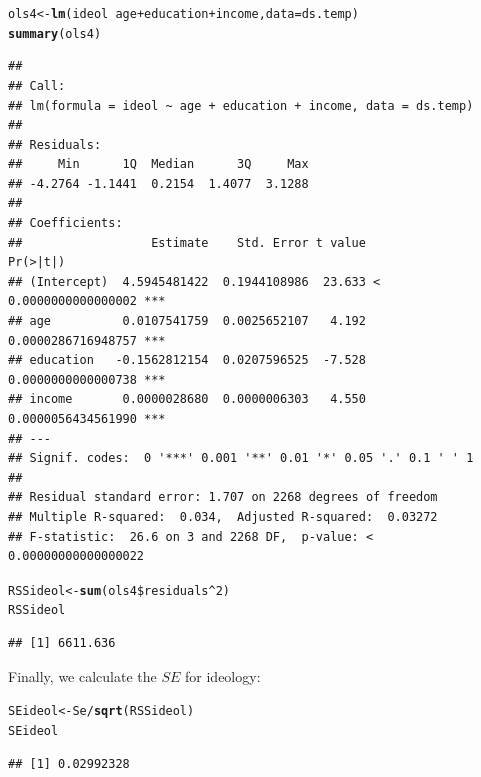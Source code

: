 \documentclass[11pt,openany]{book}\usepackage[]{graphicx}\usepackage[]{color}
\makeatletter
\newcommand{\hlnum}[1]{\textcolor[rgb]{0.686,0.059,0.569}{#1}}%
\newcommand{\hlopt}[1]{\textcolor[rgb]{0,0,0}{#1}}%
\newcommand{\hlstd}[1]{\textcolor[rgb]{0.345,0.345,0.345}{#1}}%
\newcommand{\hlkwb}[1]{\textcolor[rgb]{0.69,0.353,0.396}{#1}}%
\newcommand{\hlkwc}[1]{\textcolor[rgb]{0.333,0.667,0.333}{#1}}%
\newcommand{\hlkwd}[1]{\textcolor[rgb]{0.737,0.353,0.396}{\textbf{#1}}}%
\newenvironment{kframe}{%
 \def\at@end@of@kframe{}%
 \ifinner\ifhmode%
  \def\at@end@of@kframe{\end{minipage}}%
  \begin{minipage}{\columnwidth}%
 \fi\fi%
 \def\FrameCommand##1{\hskip\@totalleftmargin \hskip-\fboxsep
 \colorbox{shadecolor}{##1}\hskip-\fboxsep
     \hskip-\linewidth \hskip-\@totalleftmargin \hskip\columnwidth}%
 \MakeFramed {\advance\hsize-\width
   \@totalleftmargin\z@ \linewidth\hsize
   \@setminipage}}%
 {\par\unskip\endMakeFramed%
 \at@end@of@kframe}
\newenvironment{knitrout}{}{} %
\renewenvironment{knitrout}{\begin{singlespace}}{\end{singlespace}}
\makeatother
\begin{document}
\begin{knitrout}
\color{fgcolor}\begin{kframe}
\begin{alltt}
\hlstd{ols4} \hlkwb{<-} \hlkwd{lm}\hlstd{(ideol} \hlopt{~} \hlstd{age} \hlopt{+} \hlstd{education} \hlopt{+} \hlstd{income,} \hlkwc{data} \hlstd{= ds.temp)}
\hlkwd{summary}\hlstd{(ols4)}
\end{alltt}
\begin{verbatim}
## 
## Call:
## lm(formula = ideol ~ age + education + income, data = ds.temp)
## 
## Residuals:
##     Min      1Q  Median      3Q     Max 
## -4.2764 -1.1441  0.2154  1.4077  3.1288 
## 
## Coefficients:
##                  Estimate    Std. Error t value             Pr(>|t|)    
## (Intercept)  4.5945481422  0.1944108986  23.633 < 0.0000000000000002 ***
## age          0.0107541759  0.0025652107   4.192   0.0000286716948757 ***
## education   -0.1562812154  0.0207596525  -7.528   0.0000000000000738 ***
## income       0.0000028680  0.0000006303   4.550   0.0000056434561990 ***
## ---
## Signif. codes:  0 '***' 0.001 '**' 0.01 '*' 0.05 '.' 0.1 ' ' 1
## 
## Residual standard error: 1.707 on 2268 degrees of freedom
## Multiple R-squared:  0.034,	Adjusted R-squared:  0.03272 
## F-statistic:  26.6 on 3 and 2268 DF,  p-value: < 0.00000000000000022
\end{verbatim}
\begin{alltt}
\hlstd{RSSideol} \hlkwb{<-} \hlkwd{sum}\hlstd{(ols4}\hlopt{\$}\hlstd{residuals}\hlopt{^}\hlnum{2}\hlstd{)}
\hlstd{RSSideol}
\end{alltt}
\begin{verbatim}
## [1] 6611.636
\end{verbatim}
\end{kframe}
\end{knitrout}
Finally, we calculate the $SE$ for ideology:
\begin{knitrout}
\color{fgcolor}\begin{kframe}
\begin{alltt}
\hlstd{SEideol} \hlkwb{<-} \hlstd{Se}\hlopt{/}\hlkwd{sqrt}\hlstd{(RSSideol)}
\hlstd{SEideol}
\end{alltt}
\begin{verbatim}
## [1] 0.02992328
\end{verbatim}
\end{kframe}
\end{knitrout}
\end{document}
